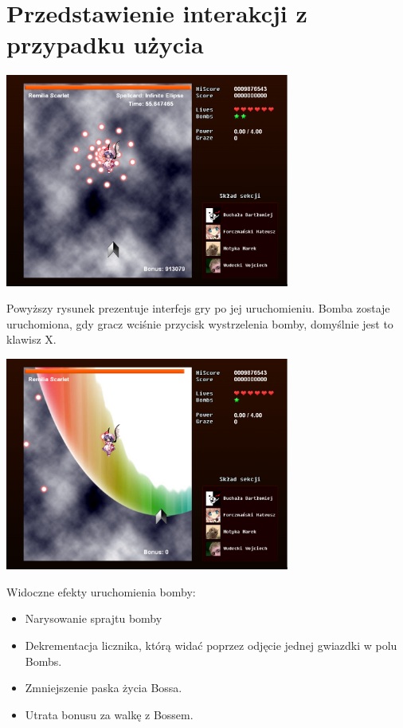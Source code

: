 \documentclass[a4paper,twoside]{article}
\begin{document}
		\section{Przedstawienie interakcji z przypadku użycia}
			\begin{center}
				\includegraphics[width=0.70\textwidth]{./images/sz1}
			\end{center}
			Powyższy rysunek prezentuje interfejs gry po jej uruchomieniu. Bomba zostaje uruchomiona, gdy gracz wciśnie przycisk wystrzelenia bomby, domyślnie jest to klawisz X.
			\begin{center}
				\includegraphics[width=0.70\textwidth]{./images/sz2}
			\end{center}
			Widoczne efekty uruchomienia bomby:
			\begin{itemize}
				\item Narysowanie sprajtu bomby
				\item Dekrementacja licznika, którą widać poprzez odjęcie jednej gwiazdki w polu Bombs.
				\item Zmniejszenie paska życia Bossa.
				\item Utrata bonusu za walkę z Bossem.
			\end{itemize}
			
\end{document}
